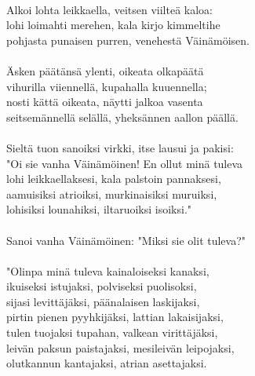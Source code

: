                                                          \\
Alkoi lohta leikkaella, veitsen viilteä kaloa:           \\
lohi loimahti merehen, kala kirjo kimmeltihe             \\
pohjasta punaisen purren, venehestä Väinämöisen.         \\
                                                         \\
Äsken päätänsä ylenti, oikeata olkapäätä                 \\
vihurilla viiennellä, kupahalla kuuennella;              \\
nosti kättä oikeata, näytti jalkoa vasenta               \\
seitsemännellä selällä, yheksännen aallon päällä.        \\
                                                         \\
Sieltä tuon sanoiksi virkki, itse lausui ja pakisi:      \\
"Oi sie vanha Väinämöinen! En ollut minä tuleva          \\
lohi leikkaellaksesi, kala palstoin pannaksesi,          \\
aamuisiksi atrioiksi, murkinaisiksi muruiksi,            \\
lohisiksi lounahiksi, iltaruoiksi isoiksi."              \\
                                                         \\
Sanoi vanha Väinämöinen: "Miksi sie olit tuleva?"        \\
                                                         \\
"Olinpa minä tuleva kainaloiseksi kanaksi,               \\
ikuiseksi istujaksi, polviseksi puolisoksi,              \\
sijasi levittäjäksi, päänalaisen laskijaksi,             \\
pirtin pienen pyyhkijäksi, lattian lakaisijaksi,         \\
tulen tuojaksi tupahan, valkean virittäjäksi,            \\
leivän paksun paistajaksi, mesileivän leipojaksi,        \\
olutkannun kantajaksi, atrian asettajaksi.               \\
                                                         \\
